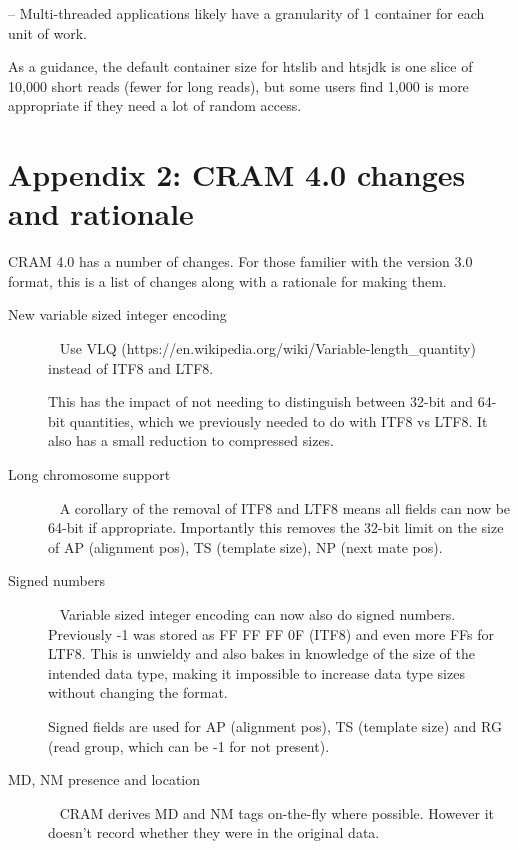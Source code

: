 \documentclass[a4paper]{article}
\begin{document}
-- Multi-threaded applications likely have a granularity of 1
container for each unit of work.

As a guidance, the default container size for htslib and htsjdk is one
slice of 10,000 short reads (fewer for long reads), but some users
find 1,000 is more appropriate if they need a lot of random access.

\section*{Appendix 2: CRAM 4.0 changes and rationale}

CRAM 4.0 has a number of changes.  For those familier with the version
3.0 format, this is a list of changes along with a rationale for
making them.

\begin{description}
\item[New variable sized integer encoding]\ \newline
  Use VLQ (https://en.wikipedia.org/wiki/Variable-length\_quantity)
  instead of ITF8 and LTF8.

  This has the impact of not needing to distinguish between 32-bit and
  64-bit quantities, which we previously needed to do with ITF8 vs
  LTF8.  It also has a small reduction to compressed sizes.


\item[Long chromosome support]\ \newline
  A corollary of the removal of ITF8 and LTF8 means all fields
  can now be 64-bit if appropriate.  Importantly this removes the
  32-bit limit on the size of AP (alignment pos), TS (template size),
  NP (next mate pos).


\item[Signed numbers]\ \newline
  Variable sized integer encoding can now also do signed numbers.
  Previously -1 was stored as FF FF FF 0F (ITF8) and even more FFs
  for LTF8.  This is unwieldy and also bakes in knowledge of the
  size of the intended data type, making it impossible to increase
  data type sizes without changing the format.

  Signed fields are used for AP (alignment pos), TS (template size)
  and RG (read group, which can be -1 for not present).


\item[MD, NM presence and location]\ \newline
  CRAM derives MD and NM tags on-the-fly where possible.  However it
  doesn't record whether they were in the original data.


\end{description}
\end{document}
